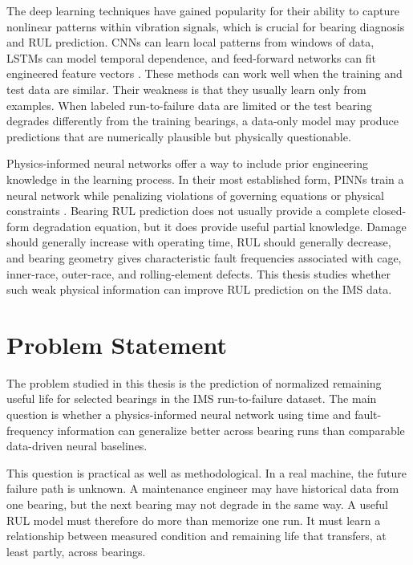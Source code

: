 The deep learning techniques have gained popularity for their ability to capture nonlinear patterns within vibration signals, which is crucial for bearing diagnosis and RUL prediction. CNNs can learn local patterns from windows of data, LSTMs can model temporal dependence, and feed-forward networks can fit engineered feature vectors \cite{babu2016,berghout2022,ayman2025}. These methods can work well when the training and test data are similar. Their weakness is that they usually learn only from examples. When labeled run-to-failure data are limited or the test bearing degrades differently from the training bearings, a data-only model may produce predictions that are numerically plausible but physically questionable.

Physics-informed neural networks offer a way to include prior engineering knowledge in the learning process. In their most established form, PINNs train a neural network while penalizing violations of governing equations or physical constraints \cite{raissi2019}. Bearing RUL prediction does not usually provide a complete closed-form degradation equation, but it does provide useful partial knowledge. Damage should generally increase with operating time, RUL should generally decrease, and bearing geometry gives characteristic fault frequencies associated with cage, inner-race, outer-race, and rolling-element defects. This thesis studies whether such weak physical information can improve RUL prediction on the IMS data.

\section{Problem Statement}

The problem studied in this thesis is the prediction of normalized remaining useful life for selected bearings in the IMS run-to-failure dataset. The main question is whether a physics-informed neural network using time and fault-frequency information can generalize better across bearing runs than comparable data-driven neural baselines.

This question is practical as well as methodological. In a real machine, the future failure path is unknown. A maintenance engineer may have historical data from one bearing, but the next bearing may not degrade in the same way. A useful RUL model must therefore do more than memorize one run. It must learn a relationship between measured condition and remaining life that transfers, at least partly, across bearings.

